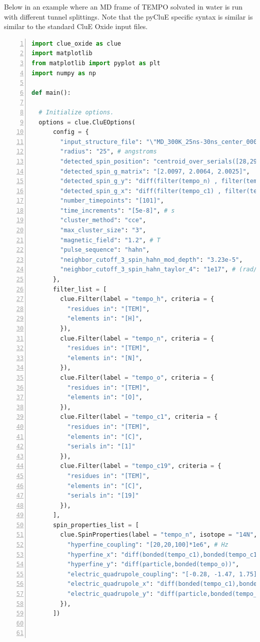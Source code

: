 \documentclass{book}
\begin{document}
Below in an example where an MD frame of TEMPO solvated in water is run with
different tunnel splittings.  
Note that the pyCluE specific syntax is similar is similar to the standard 
CluE Oxide input files. 
\begin{lstlisting}[frame=single,numbers=left,language=python]
import clue_oxide as clue
import matplotlib
from matplotlib import pyplot as plt
import numpy as np

def main():

  # Initialize options.
  options = clue.CluEOptions(
      config = {
        "input_structure_file": "\"MD_300K_25ns-30ns_center_0001.pdb\"",
        "radius": "25", # angstroms
        "detected_spin_position": "centroid_over_serials([28,29])",
        "detected_spin_g_matrix": "[2.0097, 2.0064, 2.0025]",
        "detected_spin_g_y": "diff(filter(tempo_n) , filter(tempo_o) )",
        "detected_spin_g_x": "diff(filter(tempo_c1) , filter(tempo_c19) )",
        "number_timepoints": "[101]",
        "time_increments": "[5e-8]", # s
        "cluster_method": "cce",
        "max_cluster_size": "3",
        "magnetic_field": "1.2", # T
        "pulse_sequence": "hahn",
        "neighbor_cutoff_3_spin_hahn_mod_depth": "3.23e-5",
        "neighbor_cutoff_3_spin_hahn_taylor_4": "1e17", # (rad/s)^4
      },
      filter_list = [
        clue.Filter(label = "tempo_h", criteria = {
          "residues in": "[TEM]",
          "elements in": "[H]",
        }),
        clue.Filter(label = "tempo_n", criteria = {
          "residues in": "[TEM]",
          "elements in": "[N]",
        }),
        clue.Filter(label = "tempo_o", criteria = {
          "residues in": "[TEM]",
          "elements in": "[O]",
        }),
        clue.Filter(label = "tempo_c1", criteria = {
          "residues in": "[TEM]",
          "elements in": "[C]",
          "serials in": "[1]"
        }),
        clue.Filter(label = "tempo_c19", criteria = {
          "residues in": "[TEM]",
          "elements in": "[C]",
          "serials in": "[19]"
        }),
      ],
      spin_properties_list = [
        clue.SpinProperties(label = "tempo_n", isotope = "14N", properties = {
          "hyperfine_coupling": "[20,20,100]*1e6", # Hz
          "hyperfine_x": "diff(bonded(tempo_c1),bonded(tempo_c19))",
          "hyperfine_y": "diff(particle,bonded(tempo_o))",
          "electric_quadrupole_coupling": "[-0.28, -1.47, 1.75]*1e6", # Hz
          "electric_quadrupole_x": "diff(bonded(tempo_c1),bonded(tempo_c19))",
          "electric_quadrupole_y": "diff(particle,bonded(tempo_o))",
        }),
      ])



\end{lstlisting}
\end{document}

